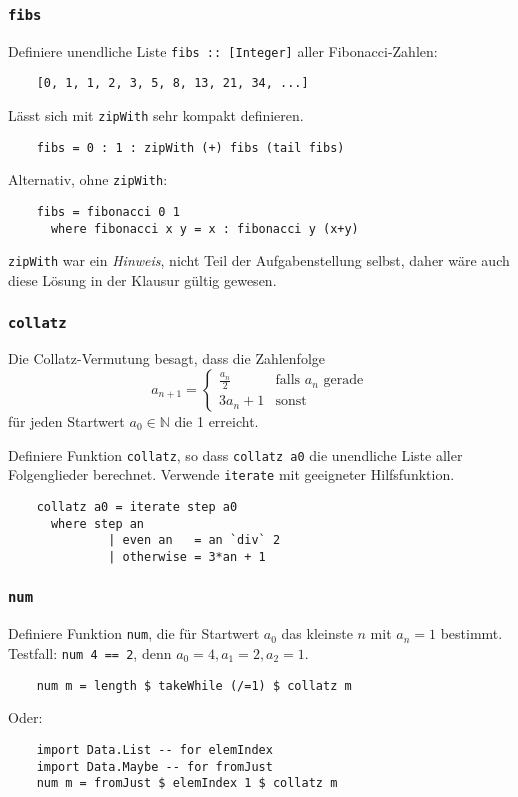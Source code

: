 \documentclass{beamer}
\date{2016-11-14/15}
\begin{document}
\normalsize
\normalem

\begin{frame}[plain]
  \titlepage
\end{frame}

\begin{frame}[fragile]
  \frametitle{\lstinline{fibs}}
  Definiere unendliche Liste \lstinline{fibs :: [Integer]} aller Fibonacci-Zahlen:
  \begin{lstlisting}
    [0, 1, 1, 2, 3, 5, 8, 13, 21, 34, ...]
  \end{lstlisting}
  Lässt sich mit \lstinline{zipWith} sehr kompakt definieren.
  \pause
  \begin{lstlisting}
    fibs = 0 : 1 : zipWith (+) fibs (tail fibs)
  \end{lstlisting}
  Alternativ, ohne \lstinline{zipWith}:
  \begin{lstlisting}
    fibs = fibonacci 0 1
      where fibonacci x y = x : fibonacci y (x+y)
  \end{lstlisting}
  \lstinline{zipWith} war ein \emph{Hinweis}, nicht Teil der Aufgabenstellung selbst, daher wäre auch diese Lösung in der Klausur gültig gewesen.
\end{frame}

\begin{frame}[fragile]
  \frametitle{\lstinline{collatz}}
  Die Collatz-Vermutung besagt, dass die Zahlenfolge
  \[a_{n+1} = \begin{cases}\frac{a_n}{2} & \text{falls $a_n$ gerade} \\ 3a_n + 1 & \text{sonst}\end{cases}\]
  für jeden Startwert $a_0 ∈ ℕ$ die 1 erreicht.
  
  Definiere Funktion \lstinline{collatz}, so dass \lstinline{collatz a0} die unendliche Liste aller Folgenglieder berechnet.
  Verwende \lstinline{iterate} mit geeigneter Hilfsfunktion.
  \pause
  \begin{lstlisting}
    collatz a0 = iterate step a0
      where step an
              | even an   = an `div` 2
              | otherwise = 3*an + 1
  \end{lstlisting}
\end{frame}

\begin{frame}[fragile]
  \frametitle{\lstinline{num}}
  Definiere Funktion \lstinline{num}, die für Startwert $a_0$ das kleinste $n$ mit $a_n = 1$ bestimmt.
  Testfall: \lstinline{num 4 == 2}, denn $a_0=4,a_1=2,a_2=1$.
  \pause
  \begin{lstlisting}
    num m = length $ takeWhile (/=1) $ collatz m
  \end{lstlisting}
  Oder:
  \begin{lstlisting}
    import Data.List -- for elemIndex
    import Data.Maybe -- for fromJust
    num m = fromJust $ elemIndex 1 $ collatz m
  \end{lstlisting}
\end{frame}
\end{document}
